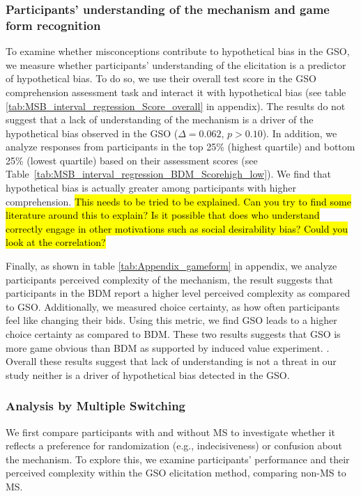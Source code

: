\documentclass[12pt]{article}
\begin{document}
\subsubsection{Participants' understanding of the mechanism and game form recognition}
To examine whether misconceptions contribute to hypothetical bias in the GSO, we measure whether participants' understanding of the elicitation is a predictor of hypothetical bias. To do so, we use their overall test score in the GSO comprehension assessment task and interact it with hypothetical bias (see table \ref{tab:MSB_interval_regression_Score_overall} in appendix). The results do not suggest that a lack of understanding of the mechanism is a driver of the hypothetical bias observed in the GSO (\(\Delta = 0.062\), \(p > 0.10\)). In addition, we analyze responses from participants in the top 25\% (highest quartile) and bottom 25\% (lowest quartile) based on their assessment scores (see Table~\ref{tab:MSB_interval_regression_BDM_Scorehigh_low}).  We find that hypothetical bias is actually greater among participants with higher comprehension. \hl{This needs to be tried to be explained. Can you try to find some literature around this to explain? Is it possible that does who understand correctly engage in other motivations such as social desirability bias? Could you look at the correlation?}

Finally, as shown in table \ref{tab:Appendix_gameform} in appendix,  we analyze participants perceived complexity of the mechanism, the result suggests that participants in the BDM report a higher level perceived complexity as compared to GSO. Additionally, we measured choice certainty, as how often participants feel like changing their bids. Using this metric, we find GSO leads to a higher choice certainty as compared to BDM. These two results suggests that GSO is more game obvious than BDM as supported by induced value experiment.  \citep{chakraborty_future_2025,brown_is_2023}.
Overall these results suggest that lack of understanding is not a threat in our study neither is a driver of hypothetical bias detected in the GSO.


\subsubsection{Analysis by Multiple Switching}
We first compare participants with and without MS to investigate whether it reflects a preference for randomization (e.g., indecisiveness) or confusion about the mechanism. To explore this, we examine participants' performance and their perceived complexity within the GSO elicitation method, comparing non-MS to MS.
\end{document}
